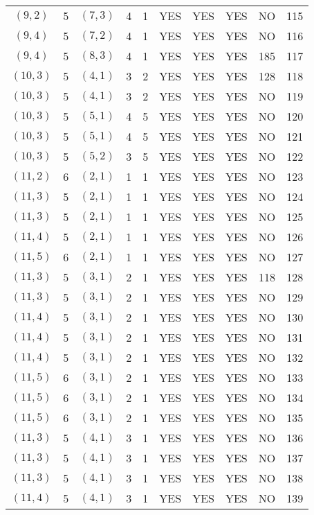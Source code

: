 \begin{longtable}{|c|c|c|c|c|c|c|c|c|c|}
$(9, 2)$ & 5 & $(7, 3)$ & 4 & 1 & YES & YES & YES & NO & 115\\
$(9, 4)$ & 5 & $(7, 2)$ & 4 & 1 & YES & YES & YES & NO & 116\\
$(9, 4)$ & 5 & $(8, 3)$ & 4 & 1 & YES & YES & YES & 185 & 117\\
$(10, 3)$ & 5 & $(4, 1)$ & 3 & 2 & YES & YES & YES & 128 & 118\\
$(10, 3)$ & 5 & $(4, 1)$ & 3 & 2 & YES & YES & YES & NO & 119\\
$(10, 3)$ & 5 & $(5, 1)$ & 4 & 5 & YES & YES & YES & NO & 120\\
$(10, 3)$ & 5 & $(5, 1)$ & 4 & 5 & YES & YES & YES & NO & 121\\
$(10, 3)$ & 5 & $(5, 2)$ & 3 & 5 & YES & YES & YES & NO & 122\\
$(11, 2)$ & 6 & $(2, 1)$ & 1 & 1 & YES & YES & YES & NO & 123\\
$(11, 3)$ & 5 & $(2, 1)$ & 1 & 1 & YES & YES & YES & NO & 124\\
$(11, 3)$ & 5 & $(2, 1)$ & 1 & 1 & YES & YES & YES & NO & 125\\
$(11, 4)$ & 5 & $(2, 1)$ & 1 & 1 & YES & YES & YES & NO & 126\\
$(11, 5)$ & 6 & $(2, 1)$ & 1 & 1 & YES & YES & YES & NO & 127\\
$(11, 3)$ & 5 & $(3, 1)$ & 2 & 1 & YES & YES & YES & 118 & 128\\
$(11, 3)$ & 5 & $(3, 1)$ & 2 & 1 & YES & YES & YES & NO & 129\\
$(11, 4)$ & 5 & $(3, 1)$ & 2 & 1 & YES & YES & YES & NO & 130\\
$(11, 4)$ & 5 & $(3, 1)$ & 2 & 1 & YES & YES & YES & NO & 131\\
$(11, 4)$ & 5 & $(3, 1)$ & 2 & 1 & YES & YES & YES & NO & 132\\
$(11, 5)$ & 6 & $(3, 1)$ & 2 & 1 & YES & YES & YES & NO & 133\\
$(11, 5)$ & 6 & $(3, 1)$ & 2 & 1 & YES & YES & YES & NO & 134\\
$(11, 5)$ & 6 & $(3, 1)$ & 2 & 1 & YES & YES & YES & NO & 135\\
$(11, 3)$ & 5 & $(4, 1)$ & 3 & 1 & YES & YES & YES & NO & 136\\
$(11, 3)$ & 5 & $(4, 1)$ & 3 & 1 & YES & YES & YES & NO & 137\\
$(11, 3)$ & 5 & $(4, 1)$ & 3 & 1 & YES & YES & YES & NO & 138\\
$(11, 4)$ & 5 & $(4, 1)$ & 3 & 1 & YES & YES & YES & NO & 139\\

\end{longtable}
